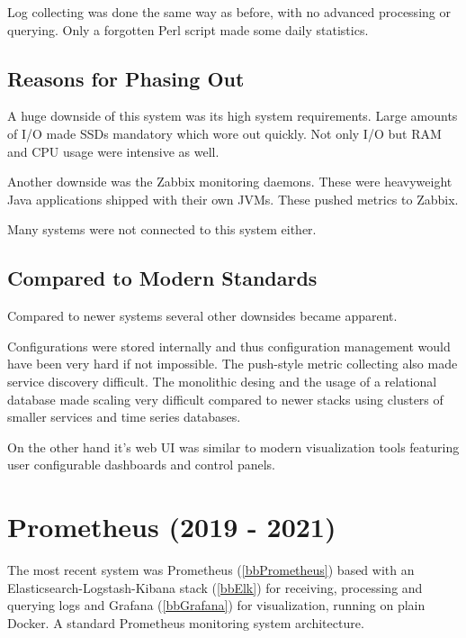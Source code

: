 Log collecting was done the same way as before, with no advanced processing or
querying. Only a forgotten Perl script made some daily statistics.

\subsection{Reasons for Phasing Out}

A huge downside of this system was its high system requirements. Large
amounts of I/O made SSDs mandatory which wore out quickly. Not only I/O but RAM
and CPU usage were intensive as well.

Another downside was the Zabbix monitoring daemons. These were heavyweight Java
applications shipped with their own JVMs. These pushed metrics to Zabbix.

Many systems were not connected to this system either.

\subsection{Compared to Modern Standards}

Compared to newer systems several other downsides became apparent.

Configurations were stored internally and thus configuration management would
have been very hard if not impossible. The push-style metric collecting also
made service discovery difficult. The monolithic desing and the usage of a
relational database made scaling very difficult compared to newer stacks using
clusters of smaller services and time series databases.

On the other hand it's web UI was similar to modern visualization tools
featuring user configurable dashboards and control panels.

\section{Prometheus (2019 - 2021)}

The most recent system was Prometheus (\autoref{bbPrometheus}) based with an
Elasticsearch-Logstash-Kibana stack (\autoref{bbElk}) for receiving, processing
and querying logs and Grafana (\autoref{bbGrafana}) for visualization, running
on plain Docker. A standard Prometheus monitoring system architecture.

